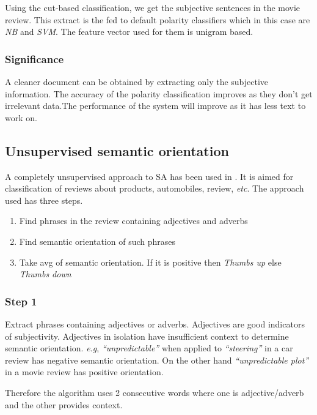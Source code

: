 Using the cut-based classification, we get the subjective sentences in the movie review. This extract is the fed to default polarity classifiers
which in this case are \textit{NB} and \textit{SVM}. The feature vector used for them is unigram based. 

\subsubsection*{Significance}

A cleaner document can be obtained by extracting only the subjective information. The accuracy of the polarity classification
improves as they don't get irrelevant data.The performance of the system will improve as it has less text to work on.

\subsection{Unsupervised semantic orientation}

A completely unsupervised approach to SA has been used in \citep*{turney2002thumbs}. It is aimed for classification of reviews about
products, automobiles, review, \textit{etc}. The approach used has three steps.

\begin{enumerate}
 \item Find phrases in the review containing adjectives and adverbs
 \item Find semantic orientation of such phrases
 \item Take avg of semantic orientation. If it is positive then \textit{Thumbs up} else \textit{Thumbs down}
\end{enumerate}

\subsubsection*{Step 1}

Extract phrases containing adjectives or adverbs. Adjectives are good indicators of subjectivity. Adjectives in isolation have 
insufficient context to determine semantic orientation. \textit{e.g}, \textit{“unpredictable”} when applied to \textit{“steering”} in a car 
review has negative semantic orientation. On the other hand \textit{“unpredictable plot”} in a movie review has positive orientation.

Therefore the algorithm uses 2 consecutive words where one is adjective/adverb and the other provides context.

